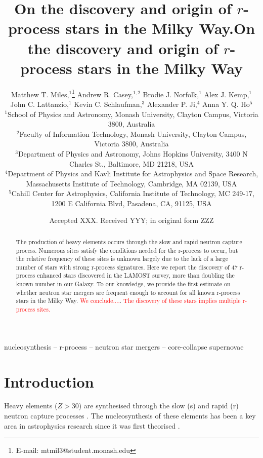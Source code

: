 \documentclass[a4paper,fleqn,usenatbib]{mnras}
\title[On the discovery and origin of r-process stars in the Milky Way.]{On the discovery and origin of $r$-process stars in the Milky Way.}
\title[Discovery and origin of $r$-process stars]{On the discovery and origin of $r$-process stars in the Milky Way}
\author[Matthew T. Miles et al.]{Matthew T. Miles,$^{1}$\thanks{E-mail: mtmil3@student.monash.edu}
	Andrew R. Casey,$^{1,2}$
	Brodie J. Norfolk,$^{1}$
	Alex J. Kemp,$^{1}$\newauthor
	John C. Lattanzio,$^{1}$
	Kevin C. Schlaufman,$^{3}$
	Alexander P. Ji,$^{4}$
	Anna Y. Q. Ho$^{5}$
	\\
	$^{1}$School of Physics and Astronomy, Monash University, Clayton Campus, Victoria 3800, Australia\\
	$^{2}$Faculty of Information Technology, Monash University, Clayton Campus, Victoria 3800, Australia\\
	$^{3}$Department of Physics and Astronomy, Johns Hopkins University, 3400 N Charles St., Baltimore, MD 21218, USA\\
	$^{4}$Department of Physics and Kavli Institute for Astrophysics and Space Research, Massachusetts Institute of Technology, Cambridge, MA 02139, USA\\
	$^{5}$Cahill Center for Astrophysics, California Institute of Technology, MC 249-17, 1200 E California Blvd, Pasadena, CA, 91125, USA
}
\date{Accepted XXX. Received YYY; in original form ZZZ}
\newcommand{\todo}[1]{\textcolor{red}{#1}}
\begin{document}
	\label{firstpage}
	\pagerange{\pageref{firstpage}--\pageref{lastpage}}
	\maketitle
	
	\begin{abstract}
		The production of heavy elements occurs through the slow and rapid neutron capture process. Numerous sites satisfy the conditions needed for the r-process to occur, but the relative frequency of these sites is unknown largely due to the lack of a large number of stars with strong r-process signatures. Here we report the discovery of 47 r-process enhanced stars discovered in the LAMOST survey, more than doubling the known number in our Galaxy. To our knowledge, we provide the first estimate on whether neutron star mergers are frequent enough to account for all known r-process stars in the Milky Way. \todo{We conclude....}. \todo{The discovery of these stars implies multiple r-process sites.}
	\end{abstract}
	
	\begin{keywords}
		nucleosynthesis -- r-process -- neutron star mergers -- core-collapse supernovae
	\end{keywords}
	
	
	\section{Introduction}
	
	Heavy elements ($Z > 30$) are synthesised through the slow (s) and rapid (r) neutron capture processes \citep{Sneden2008}. The nucleosynthesis of these elements has been a key area in astrophysics research since it was first theorised  \citep{Burbidge1957}.
	
\end{document}
